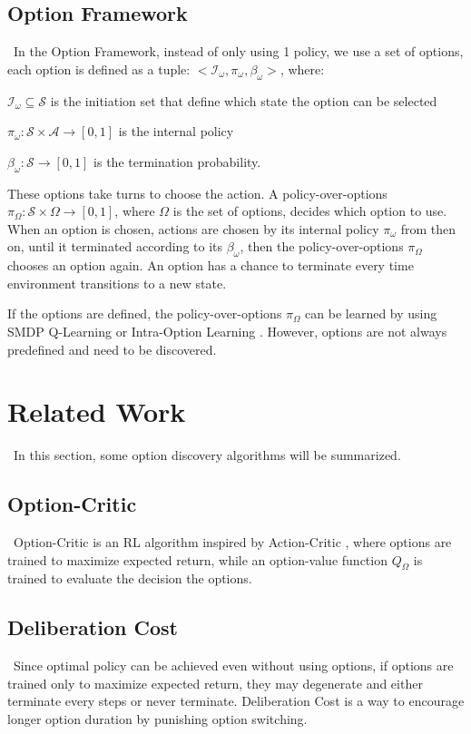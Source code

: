 \documentclass{article}
\begin{document}
	\subsection*{Option Framework}
	\qquad \ In the Option Framework\cite{SUTTON1999181}, instead of only using 1 policy, we use a set of options, each option is defined as a tuple: $<\mathcal{I}_\omega,\pi_\omega,\beta_\omega>$, where:
	
	\qquad $\mathcal{I}_\omega \subseteq \mathcal{S}$ is the initiation set that define which state the option can be selected
	
	\qquad $\pi_\omega : \mathcal{S} \times \mathcal{A} \rightarrow [0,1]$ is the internal policy
	
	\qquad $\beta_\omega:\mathcal{S} \rightarrow [0,1]$ is the termination probability.
	
	\quad These options take turns to choose the action. A policy-over-options $\pi_\Omega : \mathcal{S} \times \Omega \rightarrow [0,1]$, where $\Omega$ is the set of options, decides which option to use. When an option is chosen, actions are chosen by its internal policy $\pi_\omega$ from then on, until it terminated according to its $\beta_\omega$, then the policy-over-options $\pi_\Omega$ chooses an option again. An option has a chance to terminate every time environment transitions to a new state.
	
	\quad If the options are defined, the policy-over-options $\pi_\Omega$ can be learned by using SMDP Q-Learning \cite{smdp} or Intra-Option Learning \cite{intraoplearn}. However, options are not always predefined and need to be discovered.
	\section{Related Work}
	\qquad \ In this section, some option discovery algorithms will be summarized.
	\subsection*{Option-Critic}
	\qquad \ Option-Critic \cite{bacon2016optioncritic} is an RL algorithm inspired by Action-Critic \cite{Konda00actor-criticalgorithms}, where options are trained to maximize expected return, while an option-value function $Q_\Omega$ is trained to evaluate the decision the options.
	\subsection*{Deliberation Cost}
	\qquad \ Since optimal policy can be achieved even without using options, if options are trained only to maximize expected return, they may degenerate and either terminate every steps or never terminate. Deliberation Cost \cite{harb2017waiting} is a way to encourage longer option duration by punishing option switching.
\end{document}
